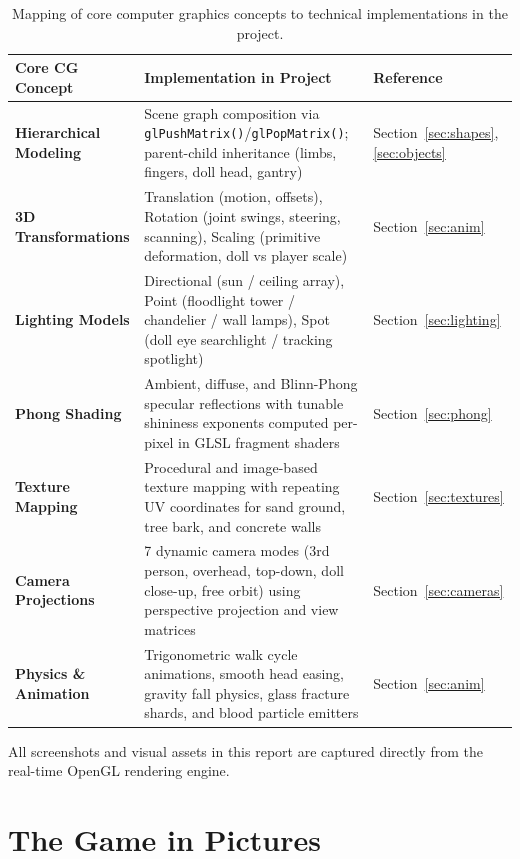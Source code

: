 \documentclass[11pt,a4paper]{article}
\begin{document}
\begin{table}[H]
\centering\small
{}
\begin{tabularx}{\linewidth}{>{\bfseries}p{3.6cm} L >{\raggedright\arraybackslash}p{2.6cm}}
\toprule
{}\textbf{Core CG Concept} & \textbf{Implementation in Project} & \textbf{Reference} \\ \midrule
Hierarchical Modeling & Scene graph composition via \texttt{glPushMatrix()}/\texttt{glPopMatrix()}; parent-child inheritance (limbs, fingers, doll head, gantry) & Section~\ref{sec:shapes}, \ref{sec:objects} \\
3D Transformations & Translation (motion, offsets), Rotation (joint swings, steering, scanning), Scaling (primitive deformation, doll vs player scale) & Section~\ref{sec:anim} \\
Lighting Models & Directional (sun / ceiling array), Point (floodlight tower / chandelier / wall lamps), Spot (doll eye searchlight / tracking spotlight) & Section~\ref{sec:lighting} \\
Phong Shading & Ambient, diffuse, and Blinn-Phong specular reflections with tunable shininess exponents computed per-pixel in GLSL fragment shaders & Section~\ref{sec:phong} \\
Texture Mapping & Procedural and image-based texture mapping with repeating UV coordinates for sand ground, tree bark, and concrete walls & Section~\ref{sec:textures} \\
Camera Projections & 7 dynamic camera modes (3rd person, overhead, top-down, doll close-up, free orbit) using perspective projection and view matrices & Section~\ref{sec:cameras} \\
Physics \& Animation & Trigonometric walk cycle animations, smooth head easing, gravity fall physics, glass fracture shards, and blood particle emitters & Section~\ref{sec:anim} \\
\bottomrule
\end{tabularx}
\caption{Mapping of core computer graphics concepts to technical implementations in the project.}
\end{table}

All screenshots and visual assets in this report are captured directly from the real-time OpenGL rendering engine.

\clearpage
\section{The Game in Pictures}
\end{document}
